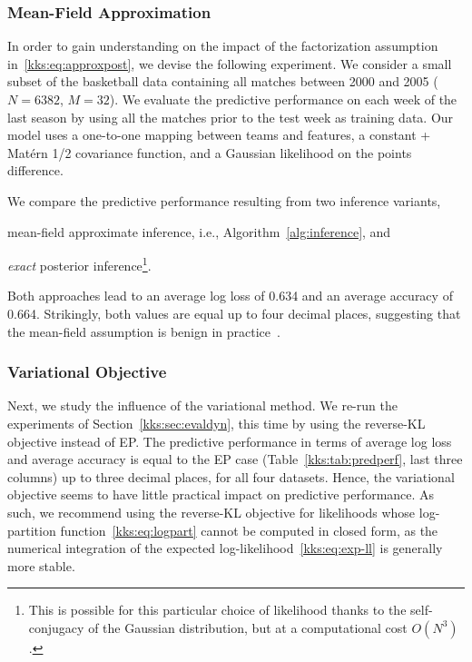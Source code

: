 \subsubsection{Mean-Field Approximation}
In order to gain understanding on the impact of the factorization assumption in~\eqref{kks:eq:approxpost}, we devise the following experiment.
We consider a small subset of the basketball data containing all matches between 2000 and 2005 ($N = 6382$, $M = 32$).
We evaluate the predictive performance on each week of the last season by using all the matches prior to the test week as training data.
Our model uses a one-to-one mapping between teams and features, a constant + Matérn 1/2 covariance function, and a Gaussian likelihood on the points difference.

We compare the predictive performance resulting from two inference variants,
\begin{enuminline}
	\item mean-field approximate inference, i.e., Algorithm~\ref{alg:inference}, and
	\item \emph{exact} posterior inference\footnote{%
		This is possible for this particular choice of likelihood thanks to the self-conjugacy of the Gaussian distribution, but at a computational cost $O(N^3)$.}.
\end{enuminline}
Both approaches lead to an average log loss of \num{0.634} and an average accuracy of \num{0.664}.
Strikingly, both values are equal up to four decimal places, suggesting that the mean-field assumption is benign in practice~\citep{birlutiu2007expectation}.


\subsubsection{Variational Objective}
Next, we study the influence of the variational method.
We re-run the experiments of Section~\ref{kks:sec:evaldyn}, this time by using the reverse-KL objective instead of EP.
The predictive performance in terms of average log loss and average accuracy is equal to the EP case (Table~\ref{kks:tab:predperf}, last three columns) up to three decimal places, for all four datasets.
Hence, the variational objective seems to have little practical impact on predictive performance.
As such, we recommend using the reverse-KL objective for likelihoods whose log-partition function~\eqref{kks:eq:logpart} cannot be computed in closed form, as the numerical integration of the expected log-likelihood~\eqref{kks:eq:exp-ll} is generally more stable.


